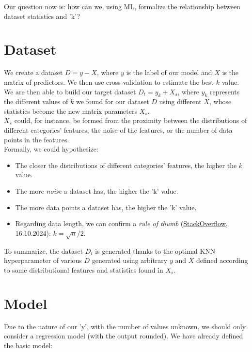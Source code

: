 \documentclass{article}
\begin{document}
Our question now is: how can we, using ML, formalize the relationship between dataset statistics and 'k'?

\section{Dataset}

We create a dataset \( D = y + X \), where \( y \) is the label of our model and \( X \) is the matrix of predictors. We then use cross-validation to estimate the best \( k \) value.
\\[0.2cm]
We are then able to build our target dataset \( D_t = y_k + X_s \), where \( y_k \) represents the different values of \( k \) we found for our dataset \( D \) using different \( X \), whose statistics become the new matrix parameters \( X_s \).
\\[0.2cm]
\( X_s \) could, for instance, be formed from the proximity between the distributions of different categories' features, the noise of the features, or the number of data points in the features.
\\[0.2cm]
Formally, we could hypothesize:
\begin{itemize}
\item The closer the distributions of different categories' features, the higher the \( k \) value.
\item The more \textit{noise} a dataset has, the higher the 'k' value.
\item The more data points a dataset has, the higher the 'k' value.
\item Regarding data length, we can confirm a \textit{rule of thumb} (\href{https://stackoverflow.com/questions/11568897/value-of-k-in-k-nearest-neighbor-algorithm}{StackOverflow}, 16.10.2024): \( k = \sqrt{n}/2 \).
\end{itemize}

To summarize, the dataset \( D_t \) is generated thanks to the optimal KNN hyperparameter of various \( D \) generated using arbitrary \( y \) and \( X \) defined according to some distributional features and statistics found in \( X_s \).

\section{Model}

Due to the nature of our 'y', with the number of values unknown, we should only consider a regression model (with the output rounded). We have already defined the basic model:
\end{document}
